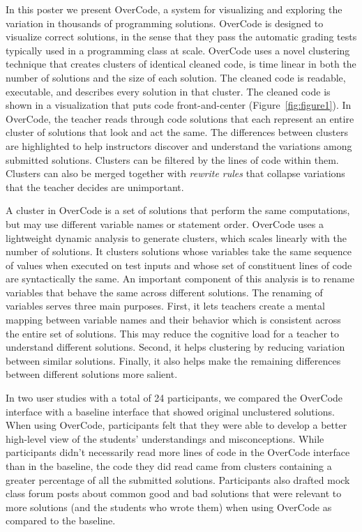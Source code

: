 \documentclass{sigchi}
\begin{document}
In this poster we present OverCode, a system for visualizing and exploring the variation in thousands of programming solutions.  OverCode is designed to visualize correct solutions, in the sense that they pass the automatic grading tests typically used in a programming class at scale.  OverCode uses a novel clustering technique that creates clusters of identical cleaned code, is time linear in both the number of solutions and the size of each solution. The cleaned code is readable, executable, and describes every solution in that cluster.  The cleaned code is shown in a visualization that puts code front-and-center (Figure~\ref{fig:figure1}). In OverCode, the teacher reads through code solutions that each represent an entire cluster of solutions that look and act the same. The differences between clusters are highlighted to help instructors discover and understand the variations among submitted solutions. Clusters can be filtered by the lines of code within them.  Clusters can also be merged together with {\em rewrite rules} that collapse variations that the teacher decides are unimportant. 

A cluster in OverCode is a set of solutions that perform the same computations, but may use different variable names or statement order.  OverCode uses a lightweight dynamic analysis to generate clusters, which scales linearly with the number of solutions. It clusters solutions whose variables take the same sequence of values when executed on test inputs and whose set of constituent lines of code are syntactically the same. An important component of this analysis is to rename variables that behave the same across different solutions. The renaming of variables serves three main purposes. First, it lets teachers create a mental mapping between variable names and their behavior which is consistent across the entire set of solutions. This may reduce the cognitive load for a teacher to understand different solutions. Second, it helps clustering by reducing variation between similar solutions. Finally, it also helps make the remaining differences between different solutions more salient. 

In two user studies with a total of 24 participants, we compared the OverCode interface with a baseline interface that showed original unclustered solutions. When using OverCode, participants felt that they were able to develop a better high-level view of the students' understandings and misconceptions. While participants didn't necessarily read more lines of code in the OverCode interface than in the baseline, the code they did read came from clusters containing a greater percentage of all the submitted solutions. Participants also drafted mock class forum posts about common good and bad solutions that were relevant to more solutions (and the students who wrote them) when using OverCode as compared to the baseline. 
\end{document}
